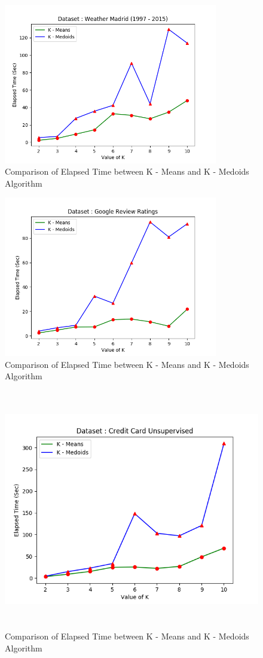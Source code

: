 \documentclass[12pt]{article}
\begin{document}
\begin{figure}[H]
	\centering
	\includegraphics[width = 0.75\linewidth, height = 7cm]{Weather.png}
	\caption{Comparison of Elapsed Time between K - Means and K - Medoids Algorithm}
	\label{fig:weather}
\end{figure}

\begin{figure}[H]
	\centering
	\includegraphics[width = 0.75\linewidth, height = 7cm]{Google.png}
	\caption{Comparison of Elapsed Time between K - Means and K - Medoids Algorithm}
	\label{fig:google}
\end{figure}

\begin{figure}[H]
	\centering
	\includegraphics[width = \linewidth, height = 10.5cm]{CreditCard.png}
	\caption{Comparison of Elapsed Time between K - Means and K - Medoids Algorithm}
	\label{fig:credit}
\end{figure}
\end{document}
